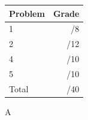 \documentclass[12pt]{article}
\newcommand{\skipline}{\vspace{12pt}}
\begin{document}
\begin{table}[hbt]
\begin{center}
\begin{tabular}{|l|r|} \hline
Problem &Grade\\
\hline \hline
\cline{1-2} 1 & \enspace\enspace\enspace\enspace\enspace\enspace/8\\
\cline{1-2} 2 & \enspace\enspace\enspace\enspace\enspace\enspace/12\\
\cline{1-2} 4 & \enspace\enspace\enspace\enspace\enspace\enspace/10\\
\cline{1-2} 5 & \enspace\enspace\enspace\enspace\enspace\enspace/10\\
\cline{1-2} Total & \enspace\enspace\enspace\enspace\enspace\enspace/40\\
\hline
\end{tabular}

\skipline

\skipline

\skipline

A
\end{center}
\end{table}
\newpage
\end{document}
